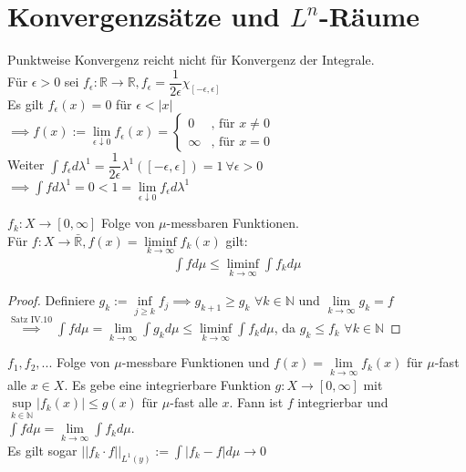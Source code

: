 \chapter{Konvergenzsätze und $L^n$-Räume}
  \begin{example}
    Punktweise Konvergenz reicht nicht für Konvergenz der Integrale.\\
    Für $\epsilon > 0$ sei $f_{\epsilon}: \mathbb{R} \to \mathbb{R}, f_{\epsilon} = \dfrac{1}{2\epsilon} \chi_{[-\epsilon, \epsilon]}$\\
    Es gilt $f_{\epsilon}(x) = 0$ für $\epsilon < |x|$\\
    $\implies f(x) := \lim\limits_{\epsilon \downarrow 0} f_{\epsilon}(x) = \begin{cases}
      0 & \text{, für } x \neq 0\\
      \infty & \text{, für } x = 0
    \end{cases}$\\
    Weiter $\int f_{\epsilon} d\lambda^1 = \dfrac{1}{2\epsilon} \lambda^1([-\epsilon, \epsilon]) = 1 \ \forall \epsilon > 0$\\
    $\implies \int f d\lambda^1 = 0 < 1 = \lim\limits_{\epsilon \downarrow 0} f_{\epsilon} d\lambda^1$
  \end{example}

  \begin{theorem}
    $f_k: X \to [0,\infty]$ Folge von $\mu$-messbaren Funktionen.\\
    Für $f: X \to \bar{\mathbb{R}}, f(x) = \liminf\limits_{k \to \infty} f_k(x)$ gilt:
    \begin{align*}
      \int f d\mu \leq \liminf\limits_{k \to \infty} \int f_k d\mu
    \end{align*}
  \end{theorem}

  \begin{proof}
    Definiere $g_k := \inf\limits_{j\geq k}f_j \implies g_{k+1} \geq g_k$ $\forall k\in\mathbb{N}$ und $\lim\limits_{k\to\infty}g_k = f$ \\
    $\overset{\text{Satz IV.10}}{\implies} \int f d\mu = \lim\limits_{k\to\infty} \int g_k d\mu \leq \liminf\limits_{k\to\infty} \int f_k d\mu$, da $g_k \leq f_k$ $\forall k\in\mathbb{N}$
  \end{proof}

  \begin{theorem}
    $f_1, f_2, ...$ Folge von $\mu$-messbare Funktionen und $f(x) = \lim\limits_{k \to \infty} f_k(x)$ für $\mu$-fast alle $x \in X$. Es gebe eine integrierbare Funktion $g: X \to [0, \infty]$ mit $\sup\limits_{k \in \mathbb{N}} |f_k(x)| \leq g(x)$ für $\mu$-fast alle $x$. Fann ist $f$ integrierbar und $\int f d\mu = \lim\limits_{k \to \infty} \int f_k d\mu$.\\
    Es gilt sogar $||f_k \cdot f||_{L^1(y)} := \int |f_k -f| d\mu \to 0$
  \end{theorem}

